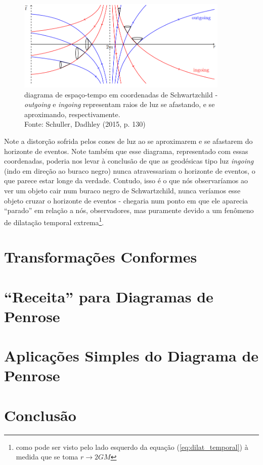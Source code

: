 \documentclass[12pt, a4paper]{article}
\theoremstyle{meuremarkstyle}
\begin{document}
\begin{figure}[h!]
  \centering
  \includegraphics[width=0.9\textwidth]{Figuras/diag_schwc.png}
  \caption{diagrama de espaço-tempo em coordenadas de Schwartzchild - \textit{outgoing} e
          \textit{ingoing} representam raios de luz se afastando, e se aproximando, respectivamente. \\Fonte: Schuller, Dadhley (2015, p. 130)\cite{schuller2015}}
  \label{fig:diag_schwc}
\end{figure}

Note a distorção sofrida pelos cones de luz ao se aproximarem e se afastarem do horizonte de eventos. Note também que
esse diagrama, representado com essas coordenadas, poderia nos levar à conclusão de que as geodésicas tipo luz \textit{ingoing} (indo em direção ao buraco negro)
nunca atravessariam o horizonte de eventos, o que parece estar longe da verdade. Contudo, isso é o que nós observaríamos ao ver um objeto cair num
buraco negro de Schwartzchild, nunca veríamos esse objeto cruzar o horizonte de eventos - chegaria num ponto em que
ele aparecia \enquote{parado} em relação a nós, observadores, mas puramente devido a um fenômeno de dilatação
temporal extrema\footnote{como pode ser visto pelo lado esquerdo da equação (\ref{eq:dilat_temporal}) à medida que se toma $r \to 2GM$}.  

\section{Transformações Conformes}
\section{\enquote{Receita} para Diagramas de Penrose}
\section{Aplicações Simples do Diagrama de Penrose}
\section{Conclusão}





\newpage

\nocite{*}
\printbibliography[title={Referências}]
\end{document}
